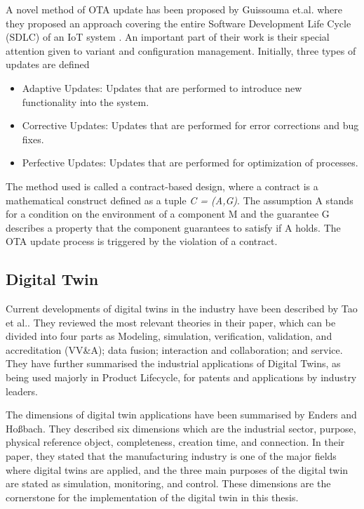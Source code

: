 A novel method of \acrshort{OTA} update has been proposed by Guissouma et.al. where they proposed an approach covering the entire Software Development Life Cycle (SDLC) of an \acrshort{IoT} system \cite{Guissouma2020}. An important part of their work is their special attention given to variant and configuration management. Initially, three types of updates are defined
\begin{itemize}
\renewcommand{\labelitemi}{$\bullet$}
    \item Adaptive Updates: Updates that are performed to introduce new functionality into the system.
    \item Corrective Updates: Updates that are performed for error corrections and bug fixes.
    \item Perfective Updates: Updates that are performed for optimization of processes.
\end{itemize}
The method used is called a contract-based design, where a contract is a mathematical construct defined as a tuple \emph{C = (A,G)}. The assumption A stands for a condition on the environment of a component M and the guarantee G describes a property that the component guarantees to satisfy if A holds. The \acrshort{OTA} update process is triggered by the violation of a contract. 

\subsection{Digital Twin}
Current developments of digital twins in the industry have been described by Tao et al.\cite{tao2019}. They reviewed the most relevant theories in their paper, which can be divided into four parts as Modeling, simulation, verification, validation, and accreditation (VV\&A); data fusion; interaction and collaboration; and service. They have further summarised the industrial applications of Digital Twins, as being used majorly in Product Lifecycle, for patents and applications by industry leaders.

The dimensions of digital twin applications have been summarised by Enders and Hoßbach\cite{enders2019}. They described six dimensions which are the industrial sector, purpose, physical reference object, completeness, creation time, and connection. In their paper, they stated that the manufacturing industry is one of the major fields where digital twins are applied, and the three main purposes of the digital twin are stated as simulation, monitoring, and control. These dimensions are the cornerstone for the implementation of the digital twin in this thesis.

